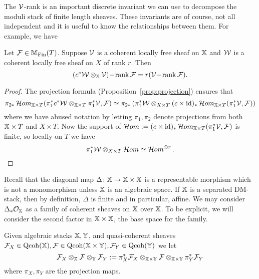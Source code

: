 \documentclass[12pt]{amsart}
\begin{document}
The $\mathcal{V}$-rank is an important discrete invariant we can use to decompose the moduli stack of finite length sheaves. These invariants are of course, not all independent and it is useful to know the relationships between them. For example, we have

\begin{proposition}  \label{prop:Vrankcoarse}
Let $\mathcal{F} \in \mathbb{M}_{\textup{Fin}}(T)$. Suppose $\mathcal{V}$ is a coherent locally free sheaf  on $\mathbb{X}$ and $\mathcal{W}$ is a coherent locally free sheaf on $X$ of rank $r$. Then
$$ (c^* \mathcal{W} \otimes_{\mathbb{X}} \mathcal{V})\!-\!\operatorname{rank} \mathcal{F} = r (\mathcal{V}\!-\!\operatorname{rank} \mathcal{F}).$$
\end{proposition}
\begin{proof}
The projection formula (Proposition~\ref{prop:projection}) ensures that 
$$ \pi_{2*} \mathop{{\mathcal{H}}om}\nolimits_{\mathbb{X} \times T}(\pi_1^*c^*\mathcal{W} \otimes_{\mathbb{X} \times T} \pi_1^* \mathcal{V}, \mathcal{F}) \simeq 
\pi_{2*} \left(\pi_1^*\mathcal{W} \otimes_{X \times T} (c\times \operatorname{id})_* \mathop{{\mathcal{H}}om}\nolimits_{\mathbb{X} \times T}(\pi_1^* \mathcal{V}, \mathcal{F})\right)$$
where we have abused notation by letting $\pi_1,\pi_2$ denote projections from both $\mathbb{X} \times T$ and $X \times T$. Now the support of $\mathop{{\mathcal{H}}om}\nolimits :=(c\times \operatorname{id})_* \mathop{{\mathcal{H}}om}\nolimits_{\mathbb{X} \times T}(\pi_1^* \mathcal{V}, \mathcal{F})$ is finite, so locally on $T$ we have 
$$ \pi_1^* \mathcal{W} \otimes_{X \times T} \mathop{{\mathcal{H}}om}\nolimits \simeq \mathop{{\mathcal{H}}om}\nolimits^{\oplus r}.$$
\end{proof}

Recall that the diagonal map $\Delta \colon \mathbb{X} \to \mathbb{X} \times \mathbb{X}$ is a representable morphism which is not a monomorphism unless $\mathbb{X}$ is an algebraic space. If $\mathbb{X}$ is a separated DM-stack, then by definition, $\Delta$ is finite and in particular, affine. We may consider $\Delta_* \mathcal{O}_{\mathbb{X}}$ as a family of coherent sheaves on $\mathbb{X}$ over $\mathbb{X}$. To be explicit, we will consider the second factor in $\mathbb{X} \times \mathbb{X}$, the base space for the family. 

\begin{notation} \label{notn:bimodtensor}
Given algebraic stacks $\mathbb{X}, \mathbb{Y}$, and quasi-coherent sheaves $\mathcal{F}_X \in \operatorname{Qcoh}(\mathbb{X}), \mathcal{F} \in \operatorname{Qcoh}(\mathbb{X} \times \mathbb{Y}), \mathcal{F}_Y \in \operatorname{Qcoh}(\mathbb{Y})$ we let 
$$ \mathcal{F}_X \otimes_{\mathbb{X}} \mathcal{F} \otimes_{\mathbb{Y}} \mathcal{F}_Y :=
\pi_X^* \mathcal{F}_X \otimes_{\mathbb{X}\times \mathbb{Y}} \mathcal{F} \otimes_{\mathbb{X} \times\mathbb{Y}} \pi_Y^*\mathcal{F}_Y $$
where $\pi_X,\pi_Y$ are the projection maps. 
\end{notation}
\end{document}
